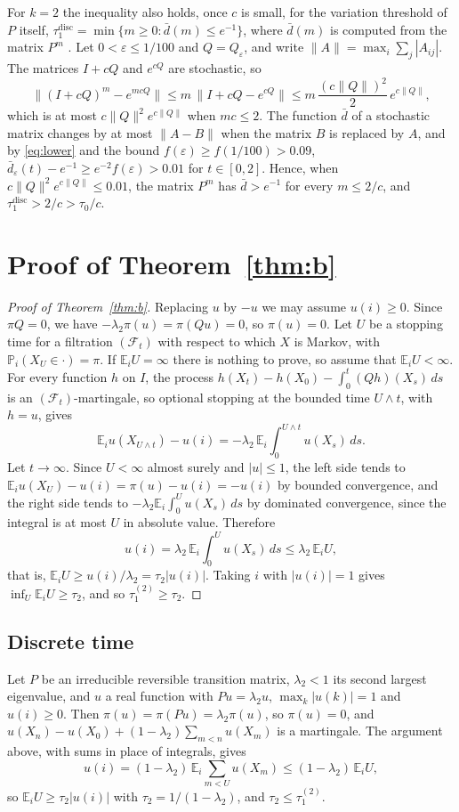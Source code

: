 \documentclass[11pt]{amsart}
\numberwithin{equation}{section}
\newcommand{\Pp}{\mathbb P}
\newcommand{\E}{\mathbb E}
\newcommand{\dbar}{\bar d}
\begin{document}
For $k=2$ the inequality also holds, once $c$ is small, for the variation threshold of $P$ itself, $\tau_1^{\mathrm{disc}}=\min\{m\ge0:\dbar(m)\le e^{-1}\}$, where $\dbar(m)$ is computed from the matrix $P^m$ \cite[Section~4.3.1]{AF}. Let $0<\varepsilon\le1/100$ and $Q=Q_\varepsilon$, and write $\|A\|=\max_i\sum_j|A_{ij}|$. The matrices $I+cQ$ and $e^{cQ}$ are stochastic, so
\[
\|(I+cQ)^m-e^{mcQ}\|\le m\,\|I+cQ-e^{cQ}\|\le m\,\frac{(c\|Q\|)^2}{2}\,e^{c\|Q\|},
\]
which is at most $c\|Q\|^2e^{c\|Q\|}$ when $mc\le2$. The function $\dbar$ of a stochastic matrix changes by at most $\|A-B\|$ when the matrix $B$ is replaced by $A$, and by \eqref{eq:lower} and the bound $f(\varepsilon)\ge f(1/100)>0.09$, $\dbar_\varepsilon(t)-e^{-1}\ge e^{-2}f(\varepsilon)>0.01$ for $t\in[0,2]$. Hence, when $c\|Q\|^2e^{c\|Q\|}\le0.01$, the matrix $P^m$ has $\dbar>e^{-1}$ for every $m\le2/c$, and $\tau_1^{\mathrm{disc}}>2/c>\tau_0/c$.

\section{Proof of Theorem~\ref{thm:b}}\label{sec:b}

\begin{proof}[Proof of Theorem~\ref{thm:b}]
Replacing $u$ by $-u$ we may assume $u(i)\ge0$. Since $\pi Q=0$, we have $-\lambda_2\pi(u)=\pi(Qu)=0$, so $\pi(u)=0$. Let $U$ be a stopping time for a filtration $(\mathcal F_t)$ with respect to which $X$ is Markov, with $\Pp_i(X_U\in\cdot)=\pi$. If $\E_iU=\infty$ there is nothing to prove, so assume that $\E_iU<\infty$. For every function $h$ on $I$, the process $h(X_t)-h(X_0)-\int_0^t(Qh)(X_s)\,ds$ is an $(\mathcal F_t)$-martingale, so optional stopping at the bounded time $U\wedge t$, with $h=u$, gives
\[
\E_iu(X_{U\wedge t})-u(i)=-\lambda_2\,\E_i\int_0^{U\wedge t}u(X_s)\,ds.
\]
Let $t\to\infty$. Since $U<\infty$ almost surely and $|u|\le1$, the left side tends to $\E_iu(X_U)-u(i)=\pi(u)-u(i)=-u(i)$ by bounded convergence, and the right side tends to $-\lambda_2\E_i\int_0^Uu(X_s)\,ds$ by dominated convergence, since the integral is at most $U$ in absolute value. Therefore
\[
u(i)=\lambda_2\,\E_i\int_0^Uu(X_s)\,ds\le\lambda_2\,\E_iU,
\]
that is, $\E_iU\ge u(i)/\lambda_2=\tau_2|u(i)|$. Taking $i$ with $|u(i)|=1$ gives $\inf_U\E_iU\ge\tau_2$, and so $\tau_1^{(2)}\ge\tau_2$.
\end{proof}

\subsection*{Discrete time}
Let $P$ be an irreducible reversible transition matrix, $\lambda_2<1$ its second largest eigenvalue, and $u$ a real function with $Pu=\lambda_2u$, $\max_k|u(k)|=1$ and $u(i)\ge0$. Then $\pi(u)=\pi(Pu)=\lambda_2\pi(u)$, so $\pi(u)=0$, and $u(X_n)-u(X_0)+(1-\lambda_2)\sum_{m<n}u(X_m)$ is a martingale. The argument above, with sums in place of integrals, gives
\[
u(i)=(1-\lambda_2)\,\E_i\sum_{m<U}u(X_m)\le(1-\lambda_2)\,\E_iU,
\]
so $\E_iU\ge\tau_2|u(i)|$ with $\tau_2=1/(1-\lambda_2)$, and $\tau_2\le\tau_1^{(2)}$.
\end{document}
